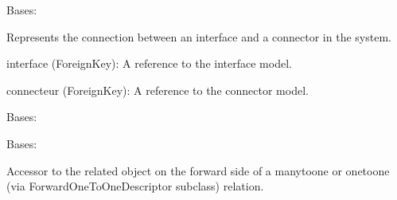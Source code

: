 \documentclass[letterpaper,10pt,english]{sphinxmanual}
\begin{document}
\begin{fulllineitems}
\label{\detokenize{app:app.models.interfaceConnector}}
\pysigstartsignatures
{}
\pysigstopsignatures
\sphinxAtStartPar
Bases: 

\sphinxAtStartPar
Represents the connection between an interface and a connector in the system.
\begin{description}
\sphinxAtStartPar
interface (ForeignKey): A reference to the interface model.

\sphinxAtStartPar
connecteur (ForeignKey): A reference to the connector model.

\end{description}

\begin{fulllineitems}
\label{\detokenize{app:app.models.interfaceConnector.DoesNotExist}}
\pysigstartsignatures
{}
\pysigstopsignatures
\sphinxAtStartPar
Bases: 

\end{fulllineitems}


\begin{fulllineitems}
\label{\detokenize{app:app.models.interfaceConnector.MultipleObjectsReturned}}
\pysigstartsignatures
{}
\pysigstopsignatures
\sphinxAtStartPar
Bases: 

\end{fulllineitems}


\begin{fulllineitems}
\label{\detokenize{app:app.models.interfaceConnector.connecteur}}
\pysigstartsignatures
{}
\pysigstopsignatures
\sphinxAtStartPar
Accessor to the related object on the forward side of a many\sphinxhyphen{}to\sphinxhyphen{}one or
one\sphinxhyphen{}to\sphinxhyphen{}one (via ForwardOneToOneDescriptor subclass) relation.


\end{fulllineitems}
\end{fulllineitems}
\end{document}
